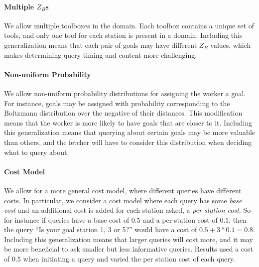 \documentclass[letterpaper]{article}
\begin{document}
\paragraph{Multiple $Z_B$s} We allow multiple toolboxes in the domain. Each toolbox contains a unique set of tools, and only one tool for each station is present in a domain. Including this generalization means that each pair of goals may have different $Z_B$ values, which makes determining query timing and content more challenging. %
\paragraph{Non-uniform Probability} We allow non-uniform probability distributions for assigning the worker a goal. For instance, goals may be assigned with probability corresponding to the Boltzmann distribution over the negative of their distances. This modification means that the worker is more likely to have goals that are closer to it. Including this generalization means that querying about certain goals may be more valuable than others, and the fetcher will have to consider this distribution when deciding what to query about.
\paragraph{Cost Model} We allow for a more general cost model, where different queries have different costs. In particular, we consider a cost model where each query has some \emph{base cost} and an additional cost is added for each station asked, a \emph{per-station cost}. So for instance if queries have a base cost of $0.5$ and a per-station cost of $0.1$, then the query ``Is your goal station 1, 3 or 5?'' would have a cost of $0.5 + 3*0.1 = 0.8$. Including this generalization means that larger queries will cost more, and it may be more beneficial to ask smaller but less informative queries.
Results used a cost of $0.5$ when initiating a query and varied the per station cost of each query.
\end{document}
